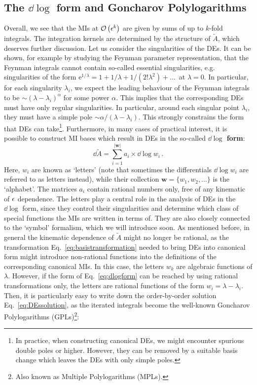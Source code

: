 \documentclass[main.tex]{subfiles}
\begin{document}
\subsection{The $\dd \log$ form and Goncharov Polylogarithms} \label{sec:DEdlogform}
Overall, we see that the MIs at $\mathcal{O}\left(\epsilon^k\right)$ are given by sums of up to $k$-fold integrals. The integration kernels are determined by the structure of $\tilde{A}$, which deserves further discussion. Let us consider the singularities of the DEs. It can be shown, for example by studying the Feynman parameter representation, that the Feynman integrals cannot contain so-called essential singularities, e.g. singularities of the form $\mathrm{e}^{1/\lambda} = 1+ 1/\lambda + 1/(2!\lambda^2)+\ldots\,$ at $\lambda=0$. In particular, for each singularity $\lambda_i$, we expect the leading behaviour of the Feynman integrals to be $\sim (\lambda- \lambda_i)^\alpha$ for some power $\alpha$. This implies that the corresponding DEs must have only regular singularities. In particular, around each singular point $\lambda_i$, they must have a simple pole $\sim \alpha/(\lambda-\lambda_i)$. This strongly constrains the form that DEs can take\footnote{In practice, when constructing canonical DEs, we might encounter spurious double poles or higher. However, they can be removed by a suitable basis change which leaves the DEs with only simple poles. }\cite{Henn:2014qga}. Furthermore, in many cases of practical interest, it is possible to construct MI bases which result in DEs in the so-called \textbf{$\dd \log$ form}:
\begin{equation} \label{eq:dlogform}
    \dd\tilde{A} = \sum_{i=1}^{|\bm{w}|} a_i \times \dd \log w_i\,.
\end{equation}
Here, $w_i$ are known as `letters' (note that sometimes the differentials $\dd \log w_i$ are referred to as letters instead), while their collection $\bm{w} = \{w_1, w_2, \ldots\}$ is the `alphabet'. The matrices $a_i$ contain rational numbers only, free of any kinematic of $\epsilon$ dependence. The letters play a central role in the analysis of DEs in the $\dd \log$ form, since they control their singularities and determine which class of special functions the MIs are written in terms of. They are also closely connected to the `symbol' formalism, which we will introduce soon. As mentioned before, in general the kinematic dependence of $\tilde{A}$ might no longer be rational, as the transformation Eq.~\ref{eq:basistransformation} needed to bring DEs into canonical form might introduce non-rational functions into the definitions of the corresponding canonical MIs. In this case, the letters $w_k$ are algebraic functions of $\lambda$. However, if the form of Eq.~\ref{eq:dlogform} can be reached by using rational transformations only, the letters are rational functions of the form $w_i = \lambda - \lambda_i$. Then, it is particularly easy to write down the order-by-order solution Eq.~\ref{eq:DEssolution}, as the iterated integrals become the well-known Goncharov Polylogarithms (GPLs)\footnote{Also known as Multiple Polylogarithms (MPLs).}\cite{2001math......3059G, 2011arXiv1105.2076G, Vollinga:2004sn}:
\end{document}
